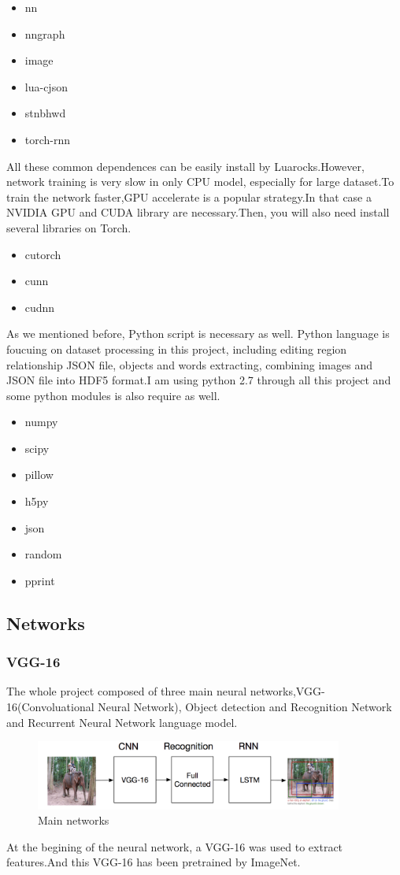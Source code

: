 \documentclass[12pt,a4paper]{report}
\begin{document}
\begin{itemize}
\item nn
\item nngraph
\item image
\item lua-cjson
\item stnbhwd
\item torch-rnn
\end{itemize}
All these common dependences can be easily install by Luarocks.However, network training is very slow in only CPU model, especially for large dataset.To train the network faster,GPU accelerate is a popular strategy.In that case a NVIDIA GPU and CUDA library  are necessary.Then, you will also need  install several libraries on Torch.
\begin{itemize}
\item cutorch
\item cunn
\item cudnn
\end{itemize}
As we mentioned before, Python script  is necessary as well. Python language is foucuing on dataset processing in this project, including editing region relationship JSON file, objects and words extracting, combining images and JSON file into HDF5 format.I am using python 2.7 through all this project and some python modules is also require as well.
\begin{itemize}
\item numpy
\item scipy
\item pillow
\item h5py
\item json
\item random
\item pprint
\end{itemize}

\subsection{Networks}
\subsubsection{VGG-16}
The whole project composed of three main neural networks,VGG-16(Convoluational Neural Network), Object detection and Recognition Network  and Recurrent Neural Network language model.

\begin{figure}[h]
\centering
\includegraphics[width=0.9\textwidth]{network.png}
\caption{Main networks}
\end{figure}
At the begining of the neural network, a VGG-16 was used to extract features.And this VGG-16 has been pretrained by ImageNet.\\
\end{document}
